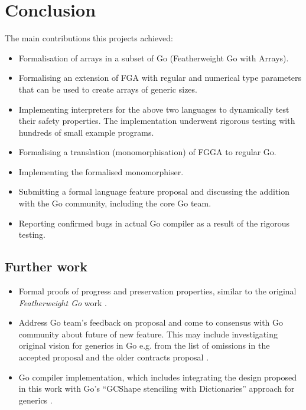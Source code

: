 \section{Conclusion}

The main contributions this projects achieved:

\begin{itemize}
    \item Formalisation of arrays in a subset of Go (Featherweight Go with
          Arrays).
    \item Formalising an extension of FGA with regular and numerical type
          parameters that can be used to create arrays of generic sizes.
    \item Implementing interpreters for the above two languages to dynamically
          test their safety properties. The implementation underwent rigorous
          testing with hundreds of small example programs.
    \item Formalising a translation (monomorphisation) of FGGA to regular Go.
    \item Implementing the formalised monomorphiser.
    \item Submitting a formal language feature proposal and discussing the
          addition with the Go community, including the core Go team.
    \item Reporting confirmed bugs in actual Go compiler as a result of the
          rigorous testing.
\end{itemize}

\subsection{Further work}

\begin{itemize}
    \item Formal proofs of progress and preservation properties, similar to the
          original \emph{Featherweight Go} work \autocite{fg}.
    \item Address Go team's feedback on proposal \autocite{myProposal} and come
          to consensus with Go community about future of new feature. This may
          include investigating original vision for generics in Go e.g. from the
          list of omissions in the accepted proposal \autocite{genericsProposal}
          and the older contracts proposal \autocite{contractsProposal}.
    \item Go compiler implementation, which includes integrating the design
          proposed in this work with Go's ``GCShape stenciling with
          Dictionaries'' approach for generics \autocite{generics1.18}.
\end{itemize}
